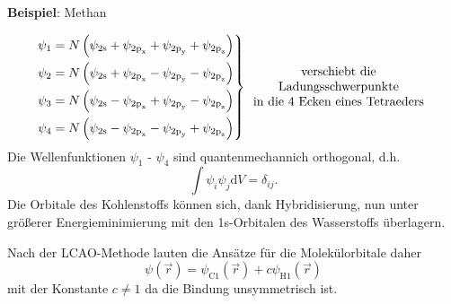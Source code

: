 \textbf{Beispiel}: Methan 
\begin{figure}[H]
    \centering
    \label{fig:vl06_abb2_kohlenstoff_hybridisiert}
\end{figure}

$$
\begin{rcases}
	\psi_1 = N \left( \psi_{\mathrm{2s}} + \psi_{\mathrm{2p}_\mathrm{x}} + \psi_{\mathrm{2p}_\mathrm{y}} + \psi_{\mathrm{2p}_\mathrm{z}} \right)  \\
	\psi_2 = N \left( \psi_{\mathrm{2s}} + \psi_{\mathrm{2p}_\mathrm{x}} - \psi_{\mathrm{2p}_\mathrm{y}} - \psi_{\mathrm{2p}_\mathrm{z}} \right)  \\
	\psi_3 = N \left( \psi_{\mathrm{2s}} - \psi_{\mathrm{2p}_\mathrm{x}} + \psi_{\mathrm{2p}_\mathrm{y}} - \psi_{\mathrm{2p}_\mathrm{z}} \right)  \\
	\psi_4 = N \left( \psi_{\mathrm{2s}} - \psi_{\mathrm{2p}_\mathrm{x}} - \psi_{\mathrm{2p}_\mathrm{y}} + \psi_{\mathrm{2p}_\mathrm{z}} \right)  \\
\end{rcases}
\begin{array}{c}
	\text{verschiebt die} \\
	\text{Ladungsschwerpunkte}\\
	\text{in die 4 Ecken eines Tetraeders}
\end{array}
$$
Die Wellenfunktionen $ \psi_{1}$ - $ \psi_{4}$ sind quantenmechannich orthogonal, d.h.
\begin{equation}
	\label{3.71}
	\int \psi_{i} \psi_{j} \mathrm{d}V = \delta_{ij}.
\end{equation}
Die Orbitale des Kohlenstoffs können sich, dank Hybridisierung, nun unter größerer Energieminimierung mit den 1s-Orbitalen des Wasserstoffs überlagern.

Nach der LCAO-Methode lauten die Ansätze für die Molekülorbitale daher
\begin{equation}
	\label{3.72}
	\psi( \Vec{r}) = \psi_{\mathrm{C1}} (\Vec{r}) + c \psi_{\mathrm{H1}}(\Vec{r})
\end{equation}
mit der Konstante $ c \neq 1 $ da die Bindung unsymmetrisch ist.
